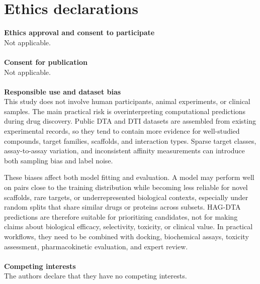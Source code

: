 \documentclass[pdflatex,sn-mathphys-num]{sn-jnl}%
\theoremstyle{thmstyleone}%
\theoremstyle{thmstyletwo}%
\theoremstyle{thmstylethree}%
\begin{document}
\section*{Ethics declarations}
\textbf{Ethics approval and consent to participate}
\\
Not applicable.
\\
\\
\textbf{Consent for publication}
\\
Not applicable.
\\
\\
\textbf{Responsible use and dataset bias}
\\
This study does not involve human participants, animal experiments, or clinical samples. The main practical risk is overinterpreting computational predictions during drug discovery. Public DTA and DTI datasets are assembled from existing experimental records, so they tend to contain more evidence for well-studied compounds, target families, scaffolds, and interaction types. Sparse target classes, assay-to-assay variation, and inconsistent affinity measurements can introduce both sampling bias and label noise.

These biases affect both model fitting and evaluation. A model may perform well on pairs close to the training distribution while becoming less reliable for novel scaffolds, rare targets, or underrepresented biological contexts, especially under random splits that share similar drugs or proteins across subsets. HAG-DTA predictions are therefore suitable for prioritizing candidates, not for making claims about biological efficacy, selectivity, toxicity, or clinical value. In practical workflows, they need to be combined with docking, biochemical assays, toxicity assessment, pharmacokinetic evaluation, and expert review.
\\
\\
\textbf{Competing interests}
\\
The authors declare that they have no competing interests.

\end{document}
